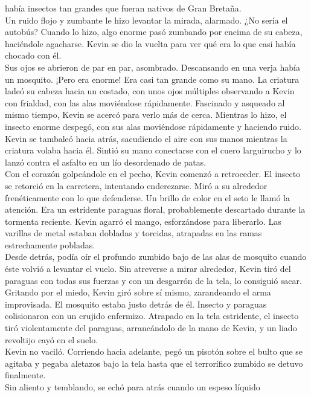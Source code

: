 había insectos tan grandes que fueran nativos de Gran Bretaña.\\
Un ruido flojo y zumbante le hizo levantar la mirada, alarmado. ¿No
sería el autobús? Cuando lo hizo, algo enorme pasó zumbando por encima
de su cabeza, haciéndole agacharse. Kevin se dio la vuelta para ver qué
era lo que casi había chocado con él.\\
Sus ojos se abrieron de par en par, asombrado. Descansando en una verja
había un mosquito. ¡Pero era enorme! Era casi tan grande como su mano.
La criatura ladeó su cabeza hacia un costado, con unos ojos múltiples
observando a Kevin con frialdad, con las alas moviéndose rápidamente.
Fascinado y asqueado al mismo tiempo, Kevin se acercó para verlo más de
cerca. Mientras lo hizo, el insecto enorme despegó, con sus alas
moviéndose rápidamente y haciendo ruido.\\
Kevin se tambaleó hacia atrás, sacudiendo el aire con sus manos mientras
la criatura volaba hacia él. Sintió su mano conectarse con el cuero
larguirucho y lo lanzó contra el asfalto en un lío desordenado de
patas.\\
Con el corazón golpeándole en el pecho, Kevin comenzó a retroceder. El
insecto se retorció en la carretera, intentando enderezarse. Miró a su
alrededor frenéticamente con lo que defenderse. Un brillo de color en el
seto le llamó la atención. Era un estridente paraguas floral,
probablemente descartado durante la tormenta reciente. Kevin agarró el
mango, esforzándose para liberarlo. Las varillas de metal estaban
dobladas y torcidas, atrapadas en las ramas estrechamente pobladas.\\
Desde detrás, podía oír el profundo zumbido bajo de las alas de mosquito
cuando éste volvió a levantar el vuelo. Sin atreverse a mirar alrededor,
Kevin tiró del paraguas con todas sus fuerzas y con un desgarrón de la
tela, lo consiguió sacar.\\
Gritando por el miedo, Kevin giró sobre sí mismo, zarandeando el arma
improvisada. El mosquito estaba justo detrás de él. Insecto y paraguas
colisionaron con un crujido enfermizo. Atrapado en la tela estridente,
el insecto tiró violentamente del paraguas, arrancándolo de la mano de
Kevin, y un liado revoltijo cayó en el suelo.\\
Kevin no vaciló. Corriendo hacia adelante, pegó un pisotón sobre el
bulto que se agitaba y pegaba aletazos bajo la tela hasta que el
terrorífico zumbido se detuvo finalmente.\\
Sin aliento y temblando, se echó para atrás cuando un espeso líquido

